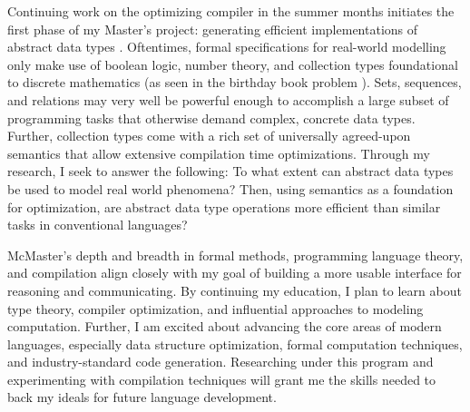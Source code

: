\documentclass[11pt]{article}
\begin{document}
Continuing work on the optimizing compiler in the summer months initiates the first phase of my Master's project: generating efficient implementations of abstract data types \cite{hunt2025generating}. Oftentimes, formal specifications for real-world modelling only make use of boolean logic, number theory, and collection types foundational to discrete mathematics (as seen in the birthday book problem \cite{spivey1989birthday}). Sets, sequences, and relations may very well be powerful enough to accomplish a large subset of programming tasks that otherwise demand complex, concrete data types. Further, collection types come with a rich set of universally agreed-upon semantics \cite{griesAndSchneider} that allow extensive compilation time optimizations. Through my research, I seek to answer the following: To what extent can abstract data types be used to model real world phenomena? Then, using semantics as a foundation for optimization, are abstract data type operations more efficient than similar tasks in conventional languages?

McMaster's depth and breadth in formal methods, programming language theory, and compilation align closely with my goal of building a more usable interface for reasoning and communicating. By continuing my education, I plan to learn about type theory, compiler optimization, and influential approaches to modeling computation. Further, I am excited about advancing the core areas of modern languages, especially data structure optimization, formal computation techniques, and industry-standard code generation. Researching under this program and experimenting with compilation techniques will grant me the skills needed to back my ideals for future language development.

\pagebreak
\nocite{*} %
\printbibliography %
\end{document}
